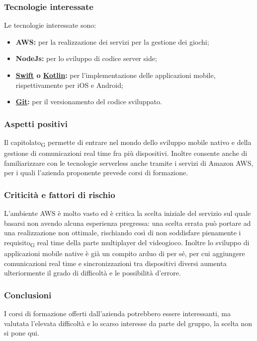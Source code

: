 \subsubsection{Tecnologie interessate}
    Le tecnologie interessate sono:
    \begin{itemize}
    	\item \textbf{AWS: }per la realizzazione dei servizi per la gestione dei giochi;
    	\item \textbf{NodeJs: }per lo sviluppo di codice server side;
    	\item \textbf{\href{https://swift.org/about/}{Swift} o \href{https://kotlinlang.org/}{Kotlin}: }per l'implementazione delle applicazioni mobile, rispettivamente per iOS e Android;
    	\item \textbf{\href{https://git-scm.com/about}{Git}: }per il versionamento del codice sviluppato.
    \end{itemize}
\subsubsection{Aspetti positivi}
    Il capitolato\textsubscript{G} permette di entrare nel mondo dello sviluppo mobile nativo e della gestione di comunicazioni real time fra più dispositivi. Inoltre consente anche di familiarizzare con le tecnologie serverless anche tramite i servizi di Amazon AWS, per i quali l'azienda proponente prevede corsi di formazione.
\subsubsection{Criticità e fattori di rischio}
    L'ambiente AWS è molto vasto ed è critica la scelta iniziale del servizio sul quale basarsi non avendo alcuna esperienza pregressa: una scelta errata può portare ad una realizzazione non ottimale, rischiando così di non soddisfare pienamente i requisito\textsubscript{G} real time della parte multiplayer del videogioco. Inoltre lo sviluppo di applicazioni mobile native è già un compito arduo di per sé, per cui aggiungere comunicazioni real time e sincronizzazioni tra dispositivi diversi aumenta ulteriormente il grado di difficoltà e le possibilità d'errore.
\subsubsection{Conclusioni}
    I corsi di formazione offerti dall'azienda potrebbero essere interessanti, ma valutata l'elevata difficoltà e lo scarso interesse da parte del gruppo, la scelta non si pone qui.